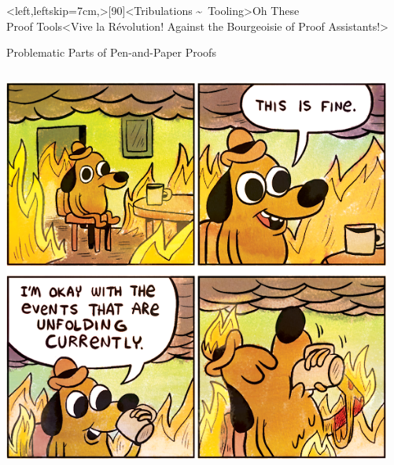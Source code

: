 \interlude*<left,leftskip=7cm,>[90]<Tribulations \textasciitilde\ Tooling>{Oh These\\Proof Tools}<Vive la Révolution! Against the Bourgeoisie of Proof Assistants!>

\begin{frame}{Problematic Parts of Pen-and-Paper Proofs}
\hypertarget{problematic-proofs}{}
  \begin{columns}[fullwidth,c]
    \begin{column}{.3\linewidth}
      \includegraphics[width=\linewidth]{graphics/this-is-fine-crop.png}\\
    \end{column}
    \hspace{1.2em}
    \begin{column}{.68\linewidth}


\end{column}
\end{columns}
\end{frame}

